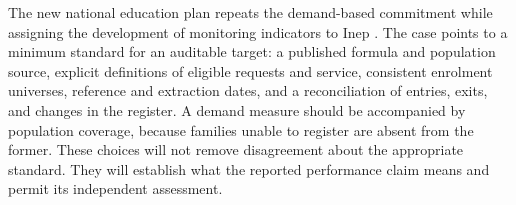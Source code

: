 The new national education plan repeats the demand-based commitment while assigning the development of monitoring indicators to Inep \citep{brasil2026pne}. The case points to a minimum standard for an auditable target: a published formula and population source, explicit definitions of eligible requests and service, consistent enrolment universes, reference and extraction dates, and a reconciliation of entries, exits, and changes in the register. A demand measure should be accompanied by population coverage, because families unable to register are absent from the former. These choices will not remove disagreement about the appropriate standard. They will establish what the reported performance claim means and permit its independent assessment.
